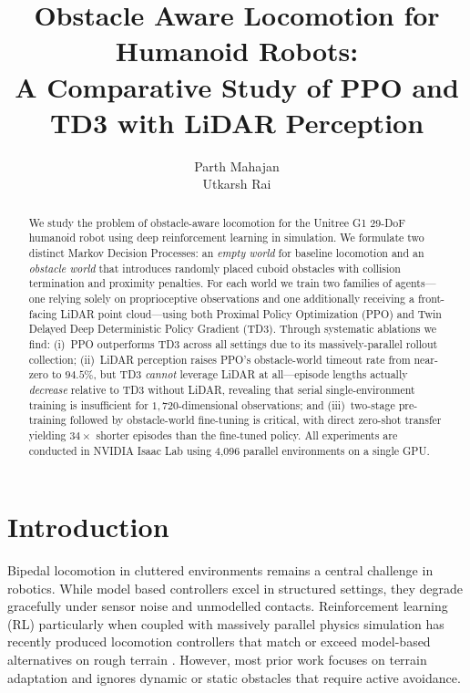 \documentclass{article}
\title{Obstacle Aware Locomotion for Humanoid Robots:\\
       A Comparative Study of PPO and TD3 with LiDAR Perception}
\author{
  Parth Mahajan\\
  Utkarsh Rai
}
\begin{document}
\maketitle

\begin{abstract}
We study the problem of obstacle-aware locomotion for the Unitree G1 29-DoF
humanoid robot using deep reinforcement learning in simulation.
We formulate two distinct Markov Decision Processes: an \emph{empty world} for
baseline locomotion and an \emph{obstacle world} that introduces randomly
placed cuboid obstacles with collision termination and proximity penalties.
For each world we train two families of agents—one relying solely on
proprioceptive observations and one additionally receiving a front-facing
LiDAR point cloud—using both Proximal Policy Optimization (PPO) and Twin
Delayed Deep Deterministic Policy Gradient (TD3).
Through systematic ablations we find: (i)~PPO outperforms TD3 across all
settings due to its massively-parallel rollout collection; (ii)~LiDAR
perception raises PPO's obstacle-world timeout rate from near-zero to $94.5\%$,
but TD3 \emph{cannot} leverage LiDAR at all—episode lengths actually
\emph{decrease} relative to TD3 without LiDAR, revealing that serial
single-environment training is insufficient for $1{,}720$-dimensional
observations; and (iii)~two-stage pre-training followed by obstacle-world
fine-tuning is critical, with direct zero-shot transfer yielding $34\times$
shorter episodes than the fine-tuned policy.
All experiments are conducted in NVIDIA Isaac Lab using 4{,}096 parallel
environments on a single GPU.
\end{abstract}

\section{Introduction}

Bipedal locomotion in cluttered environments remains a central challenge in
robotics.
While model based controllers excel in structured settings, they degrade
gracefully under sensor noise and unmodelled contacts.
Reinforcement learning (RL) particularly when coupled with massively parallel
physics simulation has recently produced locomotion controllers that match or
exceed model-based alternatives on rough terrain
\cite{lee2020learning,kumar2021rma,margolis2022rapid}.
However, most prior work focuses on terrain adaptation and ignores dynamic or
static obstacles that require active avoidance.
\end{document}
